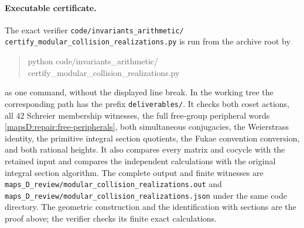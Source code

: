 \paragraph{Executable certificate.}
The exact verifier
\texttt{code/invariants\_arithmetic/}
\texttt{certify\_modular\_collision\_realizations.py}
is run from the archive root by
\begin{quote}\ttfamily\small
python code/invariants\_arithmetic/\\
\hspace*{1em}certify\_modular\_collision\_realizations.py
\end{quote}
as one command, without the displayed line break.  In the working
tree the corresponding path has the prefix \texttt{deliverables/}.
It checks both coset actions, all $42$ Schreier membership witnesses,
the full free-group peripheral words
\eqref{mapsD:repair:free-peripherals}, both simultaneous conjugacies,
the Weierstrass identity, the primitive integral section quotients,
the Fukae convention conversion, and both rational heights.  It
also compares every matrix and cocycle with the retained input and
compares the independent calculations with the original integral
section algorithm.  The complete output and finite witnesses are
\texttt{maps\_D\_review/modular\_collision\_realizations.out}
and \texttt{maps\_D\_review/modular\_collision\_realizations.json}
under the same code directory.  The geometric construction and
the identification with sections are the proof above; the verifier
checks its finite exact calculations.
